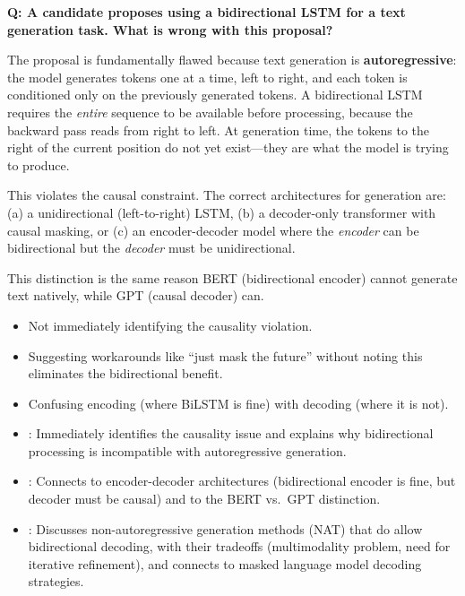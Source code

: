 \begin{interviewq}
\end{interviewq}

\begin{interviewq}
\textbf{Q: A candidate proposes using a bidirectional LSTM for a text
generation task. What is wrong with this proposal?}

 \quad {} \quad
\badgefreq{\freqmed}

\stronganswer
The proposal is fundamentally flawed because text generation is
\textbf{autoregressive}: the model generates tokens one at a time, left
to right, and each token is conditioned only on the previously generated
tokens.  A bidirectional LSTM requires the \emph{entire} sequence to be
available before processing, because the backward pass reads from right
to left.  At generation time, the tokens to the right of the current
position do not yet exist---they are what the model is trying to
produce.

This violates the causal constraint.  The correct architectures for
generation are: (a) a unidirectional (left-to-right) LSTM, (b) a
decoder-only transformer with causal masking, or (c) an encoder-decoder
model where the \emph{encoder} can be bidirectional but the
\emph{decoder} must be unidirectional.

This distinction is the same reason BERT (bidirectional encoder) cannot
generate text natively, while GPT (causal decoder) can.

\redflags
\begin{itemize}
\item Not immediately identifying the causality violation.
\item Suggesting workarounds like ``just mask the future'' without
  noting this eliminates the bidirectional benefit.
\item Confusing encoding (where BiLSTM is fine) with decoding (where
  it is not).
\end{itemize}


\goodgreat
\begin{itemize}
\item {}: Immediately identifies the causality issue and
  explains why bidirectional processing is incompatible with
  autoregressive generation.
\item {}: Connects to encoder-decoder architectures
  (bidirectional encoder is fine, but decoder must be causal) and to
  the BERT vs.\ GPT distinction.
\item {}: Discusses non-autoregressive generation methods
  (NAT) that do allow bidirectional decoding, with their tradeoffs
  (multimodality problem, need for iterative refinement), and connects
  to masked language model decoding strategies.
\end{itemize}


\end{interviewq}
